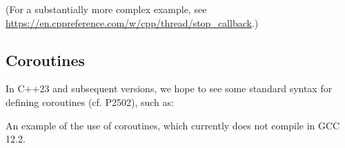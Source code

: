 (For a substantially more complex example, see \url{https://en.cppreference.com/w/cpp/thread/stop_callback}.)



\subsection{Coroutines}

In C++23 and subsequent versions, we hope to see some standard syntax for defining coroutines (cf. P2502), such as:

\raggedbottom
\begin{codebox}[]{}
\footnotesize An example of the use of coroutines, which currently does not compile in GCC 12.2.
\tcblower
{}
\end{codebox}

